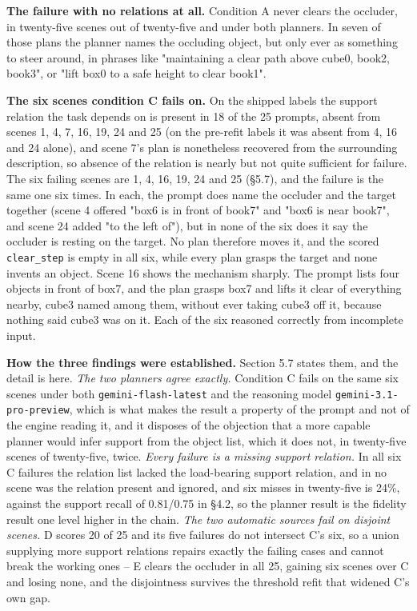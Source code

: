\textbf{The failure with no relations at all.} Condition A never clears the occluder, in twenty-five scenes out of twenty-five and under both planners. In seven of those plans the planner names the occluding object, but only ever as something to steer around, in phrases like "maintaining a clear path above cube0, book2, book3", or "lift box0 to a safe height to clear book1".

\textbf{The six scenes condition C fails on.} On the shipped labels the support relation the task depends on is present in 18 of the 25 prompts, absent from scenes 1, 4, 7, 16, 19, 24 and 25 (on the pre-refit labels it was absent from 4, 16 and 24 alone), and scene 7's plan is nonetheless recovered from the surrounding description, so absence of the relation is nearly but not quite sufficient for failure. The six failing scenes are 1, 4, 16, 19, 24 and 25 (\S{}5.7), and the failure is the same one six times. In each, the prompt does name the occluder and the target together (scene 4 offered "box6 is in front of book7" and "box6 is near book7", and scene 24 added "to the left of"), but in none of the six does it say the occluder is resting on the target. No plan therefore moves it, and the scored \texttt{clear\_\allowbreak{}step} is empty in all six, while every plan grasps the target and none invents an object. Scene 16 shows the mechanism sharply. The prompt lists four objects in front of box7, and the plan grasps box7 and lifts it clear of everything nearby, cube3 named among them, without ever taking cube3 off it, because nothing said cube3 was on it. Each of the six reasoned correctly from incomplete input.

\textbf{How the three findings were established.} Section 5.7 states them, and the detail is here. \textit{The two planners agree exactly.} Condition C fails on the same six scenes under both \texttt{gemini-flash-latest} and the reasoning model \texttt{gemini-3.1-pro-preview}, which is what makes the result a property of the prompt and not of the engine reading it, and it disposes of the objection that a more capable planner would infer support from the object list, which it does not, in twenty-five scenes of twenty-five, twice. \textit{Every failure is a missing support relation.} In all six C failures the relation list lacked the load-bearing support relation, and in no scene was the relation present and ignored, and six misses in twenty-five is 24\%, against the support recall of 0.81/0.75 in \S{}4.2, so the planner result is the fidelity result one level higher in the chain. \textit{The two automatic sources fail on disjoint scenes.} D scores 20 of 25 and its five failures do not intersect C's six, so a union supplying more support relations repairs exactly the failing cases and cannot break the working ones -- E clears the occluder in all 25, gaining six scenes over C and losing none, and the disjointness survives the threshold refit that widened C's own gap.

